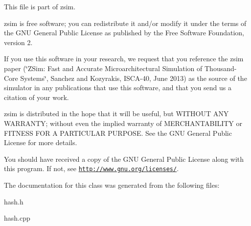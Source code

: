 This file is part of zsim.

zsim is free software; you can redistribute it and/or modify it under the terms of the G\-N\-U General Public License as published by the Free Software Foundation, version 2.

If you use this software in your research, we request that you reference the zsim paper (\char`\"{}\-Z\-Sim\-: Fast and Accurate Microarchitectural Simulation of
\-Thousand-\/\-Core Systems\char`\"{}, Sanchez and Kozyrakis, I\-S\-C\-A-\/40, June 2013) as the source of the simulator in any publications that use this software, and that you send us a citation of your work.

zsim is distributed in the hope that it will be useful, but W\-I\-T\-H\-O\-U\-T A\-N\-Y W\-A\-R\-R\-A\-N\-T\-Y; without even the implied warranty of M\-E\-R\-C\-H\-A\-N\-T\-A\-B\-I\-L\-I\-T\-Y or F\-I\-T\-N\-E\-S\-S F\-O\-R A P\-A\-R\-T\-I\-C\-U\-L\-A\-R P\-U\-R\-P\-O\-S\-E. See the G\-N\-U General Public License for more details.

You should have received a copy of the G\-N\-U General Public License along with this program. If not, see \href{http://www.gnu.org/licenses/}{\tt http\-://www.\-gnu.\-org/licenses/}. 

The documentation for this class was generated from the following files\-:\begin{DoxyCompactItemize}
\item 
hash.\-h\item 
hash.\-cpp\end{DoxyCompactItemize}
